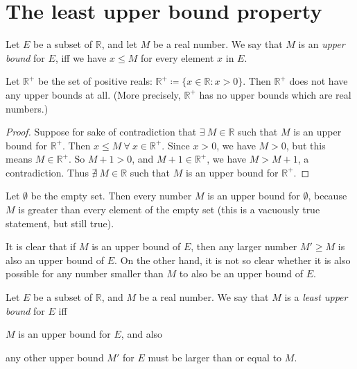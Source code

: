 \section{The least upper bound property}

\begin{definition}\label{5.5.1}
Let \(E\) be a subset of \(\mathds{R}\), and let \(M\) be a real number.
We say that \(M\) is an \emph{upper bound} for \(E\), iff we have \(x \leq M\) for every element \(x\) in \(E\).
\end{definition}

\begin{additional corollary}\label{ac 5.5.1}
Let \(\mathds{R}^+\) be the set of positive reals: \(\mathds{R}^+ \coloneqq \{x \in \mathds{R} : x > 0\}\).
Then \(\mathds{R}^+\) does not have any upper bounds at all.
(More precisely, \(\mathds{R}^+\) has no upper bounds which are real numbers.)
\end{additional corollary}

\begin{proof}
Suppose for sake of contradiction that \(\exists\ M \in \mathds{R}\) such that \(M\) is an upper bound for \(\mathds{R}^+\).
Then \(x \leq M \ \forall\ x \in \mathds{R}^+\).
Since \(x > 0\), we have \(M > 0\), but this means \(M \in \mathds{R}^+\).
So \(M + 1 > 0\), and \(M + 1 \in \mathds{R}^+\), we have \(M > M + 1\), a contradiction.
Thus \(\nexists\ M \in \mathds{R}\) such that \(M\) is an upper bound for \(\mathds{R}^+\).
\end{proof}

\setcounter{theorem}{3}
\begin{example}\label{5.5.4}
Let \(\emptyset\) be the empty set.
Then every number \(M\) is an upper bound for \(\emptyset\), because \(M\) is greater than every element of the empty set
(this is a vacuously true statement, but still true).
\end{example}

\begin{note}
It is clear that if \(M\) is an upper bound of \(E\), then any larger number \(M' \geq M\) is also an upper bound of \(E\).
On the other hand, it is not so clear whether it is also possible for any number smaller than \(M\) to also be an upper bound of \(E\).
\end{note}

\begin{definition}\label{5.5.5}
Let \(E\) be a subset of \(\mathds{R}\), and \(M\) be a real number.
We say that \(M\) is a \emph{least upper bound} for \(E\) iff
\begin{enumerate*}
    \item \(M\) is an upper bound for \(E\), and also
    \item any other upper bound \(M'\) for \(E\) must be larger than or equal to \(M\).
\end{enumerate*}
\end{definition}

